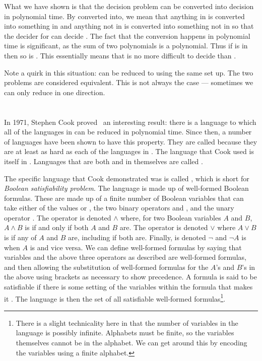 \documentclass{iansnotes}
\begin{document}
  What we have shown is that the  decision problem can be converted into  decision in polynomial time.
  By converted into, we mean that anything in  is converted into something in  and anything not in  is converted into something not in  so that the decider for  can decide .
  The fact that the conversion happens in polynomial time is significant, as the sum of two polynomials is a polynomial.
  Thus if  is in  then so is .
  This essentially means that  is no more difficult to decide than .

  Note a quirk in this situation:  can be reduced to  using the same set up.
  The two problems are considered equivalent.
  This is not always the case --- sometimes we can only reduce in one direction.

\section{}
  In 1971, Stephen Cook proved~\autocite{cook71} an interesting result: there is a language to which all of the languages in  can be reduced in polynomial time.
  Since then, a number of languages have been shown to have this property.
  They are called  because they are at least as hard as each of the languages in .
  The language that Cook used is itself in .
  Languages that are both  and in  themselves are called .

  The specific language that Cook demonstrated was  is called , which is short for \emph{Boolean satisfiability problem}.
  The language is made up of well-formed Boolean formulas.
  These are made up of a finite number of Boolean variables that can take either of the values  or , the two binary operators  and , and the unary operator .
  The  operator is denoted $\land$ where, for two Boolean variables $A$ and $B$, $A \land B$ is  if and only if both $A$ and $B$ are.
  The  operator is denoted $\lor$ where $A \lor B$ is  if any of $A$ and $B$ are, including if both are.
  Finally,  is denoted $\neg$ and $\neg A$ is  when $A$ is  and vice versa.
  We can define well-formed formulas by saying that variables and the above three operators as described are well-formed formulas, and then allowing the substitution of well-formed formulas for the $A$'s and $B$'s in the above using brackets as necessary to show precedence.
  A formula is said to be satisfiable if there is some setting of the variables within the formula that makes it .
  The language  is then the set of all satisfiable well-formed formulas\footnote{There is a slight technicality here in that the number of variables in the language is possibly infinite. Alphabets must be finite, so the variables themselves cannot be in the alphabet. We can get around this by encoding the variables using a finite alphabet.}.

\end{document}
